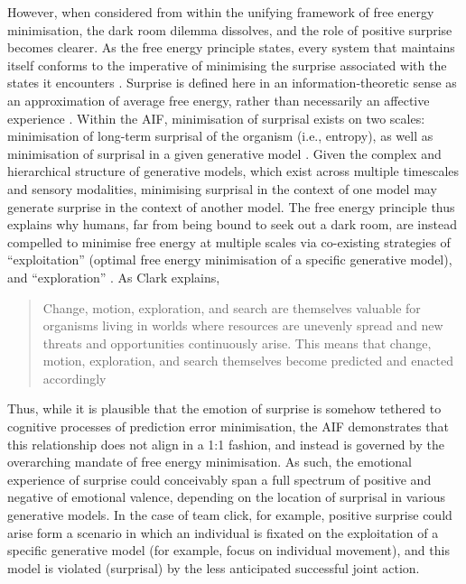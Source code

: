 \begin{CJK}{UTF8}{gbsn}
However, when considered from within the unifying framework of free energy minimisation, the dark room dilemma dissolves, and the role of positive surprise becomes clearer.  As the free energy principle states, every system that maintains itself conforms to the imperative of minimising the surprise associated with the states it encounters \citep{Friston}.  Surprise is defined here in an information-theoretic sense as an approximation of average free energy, rather than necessarily an affective experience \citep[in fact, Tribus distinguished information-theoretic ``surprisal'' from surprise in an active attempt to separate the two concepts cf.][]{Tribus1961}.  Within the AIF, minimisation of surprisal exists on two scales: minimisation of long-term surprisal of the organism (i.e., entropy), as well as minimisation of surprisal in a given generative model \citep[i.e., free energy, see][2]{Schwartenbeck2013}.  Given the complex and hierarchical structure of generative models, which exist across multiple timescales and sensory modalities,  minimising surprisal in the context of one model may generate surprise in the context of another model.  The free energy principle thus explains why humans, far from being bound to seek out a dark room, are instead compelled to minimise free energy at multiple scales via co-existing strategies of ``exploitation'' (optimal free energy minimisation of a specific generative model), and ``exploration'' \citep[optimal free energy reduction of surprisal on broader scales, i.e., in the context of other generative models or the life of the organism more generally; see][]{Cohen2007}.  As Clark explains,

      \begin{quote}
        Change, motion, exploration, and search are themselves valuable for organisms living in worlds where resources are unevenly spread and new threats and opportunities continuously arise.  This means that change, motion, exploration, and search themselves become predicted and enacted accordingly \citep[193]{Clark2013}
      \end{quote}

Thus, while it is plausible that the emotion of surprise is somehow tethered to cognitive processes of prediction error minimisation, the AIF demonstrates that this relationship does not align in a 1:1 fashion, and instead is governed by the overarching mandate of free energy minimisation.  As such, the emotional experience of surprise could conceivably span a full spectrum of positive and negative of emotional valence, depending on the location of surprisal in various generative models.  In the case of team click, for example, positive surprise could arise form a scenario in which an individual is fixated on the exploitation of a specific generative model (for example, focus on individual movement), and this model is violated (surprisal) by the less anticipated successful joint action.


\end{CJK}
